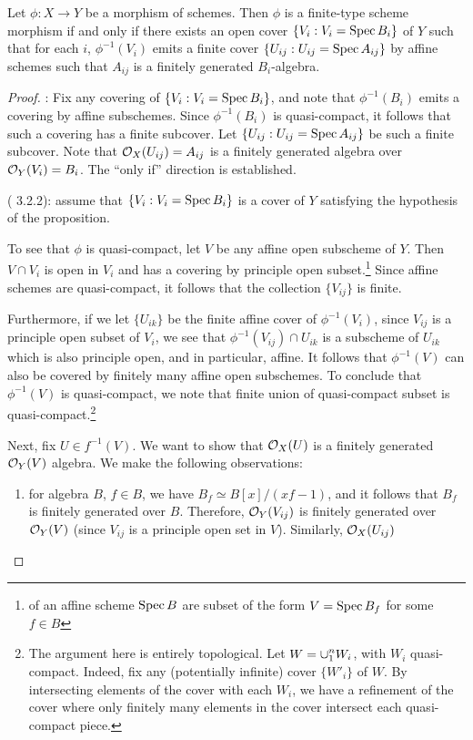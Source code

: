 \begin{prop}
Let $\phi: X \to Y$ be a morphism of schemes. Then $\phi$ is a 
finite-type scheme morphism if and only if there exists an open 
cover $\{V_i : V_i = \mathrm{Spec}\, B_i \}$ of $Y$ such that for each $i$, 
$\phi^{-1}(V_i)$ emits a finite cover $\{U_{ij} : U_{ij} = \mathrm{Spec}\, 
A_{ij}\}$ by affine schemes such that $A_{ij}$ is a finitely 
generated $B_i$-algebra.
\end{prop}
\begin{proof}
\pfitem{$\Rightarrow$}: Fix any covering of $\{V_i : V_i = \mathrm{Spec}\, 
B_i\}$, and note that $\phi^{-1}(B_i)$ emits a covering by affine
subschemes. Since $\phi^{-1}(B_i)$ is quasi-compact, it follows that
such a covering has a finite subcover. Let $\{U_{ij} : U_{ij} = 
\mathrm{Spec}\, A_{ij}\}$ be such a finite subcover. Note that $\mathcal{O}_X(U_{ij}) 
= A_{ij}$ is a finitely generated algebra over $\mathcal{O}_Y(V_i) = B_i$.
The ``only if'' direction is established.

\pfitem{$\Leftarrow$} (\cite{Liu} 3.2.2): assume that $\{V_i :
V_i = \mathrm{Spec}\, B_i\}$ is a cover of $Y$ satisfying the hypothesis
of the proposition.

To see that $\phi$ is quasi-compact, let $V$ be any affine open 
subscheme of $Y$. Then $V \cap V_i$ is open in $V_i$ and has a
covering by principle open subset.\footnote{ of an affine scheme $\mathrm{Spec}\, B$ are 
subset of the form $V = \mathrm{Spec}\, B_f$ for some $f \in B$} Since 
affine schemes are quasi-compact, it follows that the collection 
$\{V_{ij}\}$ is finite.

Furthermore, if we let $\{U_{ik}\}$ be the finite affine cover of 
$\phi^{-1}(V_i)$, since $V_{ij}$ is a principle open subset of 
$V_i$, we see that $\phi^{-1}(V_{ij}) \cap U_{ik}$ is a subscheme 
of $U_{ik}$ which is also principle open, and in particular, 
affine.  It follows that $\phi^{-1}(V)$ can also be covered by 
finitely many affine open subschemes. To conclude that 
$\phi^{-1}(V)$ is quasi-compact, we note that finite union of 
quasi-compact subset is quasi-compact.\footnote{The argument here 
is entirely topological. Let $\displaystyle W = \cup_1^n W_i$, with $W_i$ 
quasi-compact. Indeed, fix any (potentially infinite) cover 
$\{W'_i\}$ of $W$. By intersecting elements of the cover with each 
$W_i$, we have a refinement of the cover where only finitely many 
elements in the cover intersect each quasi-compact piece.}

Next, fix $U \in f^{-1}(V)$. We want to show that $\mathcal{O}_X(U)$ is a
finitely generated $\mathcal{O}_Y(V)$ algebra. We make the following 
observations:
\begin{enumerate}
\item for algebra $B$, $f \in B$, we have $B_f \simeq B[x]/(xf - 
1)$, and it follows that $B_f$ is finitely generated over $B$. 
Therefore, $\mathcal{O}_Y(V_{ij})$ is finitely generated over $\mathcal{O}_Y(V)$
(since $V_{ij}$ is a principle open set in $V$). Similarly,
$\mathcal{O}_X(U_{ij})$


\end{enumerate}
\end{proof}
